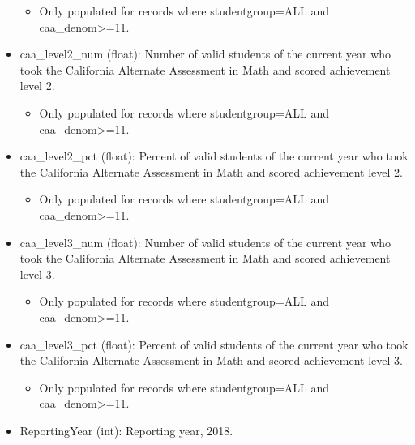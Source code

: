 \documentclass[11pt]{article}
\providecommand{\tightlist}{%
      \setlength{\itemsep}{0pt}\setlength{\parskip}{0pt}}
\begin{document}
\begin{itemize}
  \begin{itemize}
  \tightlist
  \item
    Only populated for records where studentgroup=ALL and
    caa\_denom\textgreater{}=11.
  \end{itemize}
\item
  caa\_level2\_num (float): Number of valid students of the current year
  who took the California Alternate Assessment in Math and scored
  achievement level 2.

  \begin{itemize}
  \tightlist
  \item
    Only populated for records where studentgroup=ALL and
    caa\_denom\textgreater{}=11.
  \end{itemize}
\item
  caa\_level2\_pct (float): Percent of valid students of the current
  year who took the California Alternate Assessment in Math and scored
  achievement level 2.

  \begin{itemize}
  \tightlist
  \item
    Only populated for records where studentgroup=ALL and
    caa\_denom\textgreater{}=11.
  \end{itemize}
\item
  caa\_level3\_num (float): Number of valid students of the current year
  who took the California Alternate Assessment in Math and scored
  achievement level 3.

  \begin{itemize}
  \tightlist
  \item
    Only populated for records where studentgroup=ALL and
    caa\_denom\textgreater{}=11.
  \end{itemize}
\item
  caa\_level3\_pct (float): Percent of valid students of the current
  year who took the California Alternate Assessment in Math and scored
  achievement level 3.

  \begin{itemize}
  \tightlist
  \item
    Only populated for records where studentgroup=ALL and
    caa\_denom\textgreater{}=11.
  \end{itemize}
\item
  ReportingYear (int): Reporting year, 2018.
\end{itemize}
\end{document}
